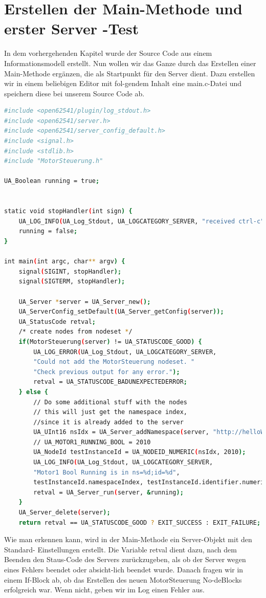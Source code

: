 \section{Erstellen der Main-Methode und erster Server -Test}
In dem vorhergehenden Kapitel wurde der Source Code aus einem Informationsmodell erstellt. Nun wollen wir das Ganze durch das Erstellen einer Main-Methode ergänzen, die als Startpunkt für den Server dient. Dazu erstellen wir in einem beliebigen Editor mit fol-gendem Inhalt eine main.c-Datei und speichern diese bei unserem Source Code ab.
\begin{lstlisting}[language=Bash]
#include <open62541/plugin/log_stdout.h>
#include <open62541/server.h>
#include <open62541/server_config_default.h>
#include <signal.h>
#include <stdlib.h>
#include "MotorSteuerung.h"

UA_Boolean running = true;


static void stopHandler(int sign) {
	UA_LOG_INFO(UA_Log_Stdout, UA_LOGCATEGORY_SERVER, "received ctrl-c");
	running = false;
}

int main(int argc, char** argv) {
	signal(SIGINT, stopHandler);
	signal(SIGTERM, stopHandler);
	
	UA_Server *server = UA_Server_new();
	UA_ServerConfig_setDefault(UA_Server_getConfig(server));
	UA_StatusCode retval;
	/* create nodes from nodeset */
	if(MotorSteuerung(server) != UA_STATUSCODE_GOOD) {
		UA_LOG_ERROR(UA_Log_Stdout, UA_LOGCATEGORY_SERVER,
		"Could not add the MotorSteuerung nodeset. "
		"Check previous output for any error.");
		retval = UA_STATUSCODE_BADUNEXPECTEDERROR;
	} else {
		// Do some additional stuff with the nodes
		// this will just get the namespace index,
		//since it is already added to the server
		UA_UInt16 nsIdx = UA_Server_addNamespace(server, "http://helloWorld.com/UA/");
		// UA_MOTOR1_RUNNING_BOOL = 2010
		UA_NodeId testInstanceId = UA_NODEID_NUMERIC(nsIdx, 2010);
		UA_LOG_INFO(UA_Log_Stdout, UA_LOGCATEGORY_SERVER,
		"Motor1 Bool Running is in ns=%d;id=%d",
		testInstanceId.namespaceIndex, testInstanceId.identifier.numeric);
		retval = UA_Server_run(server, &running);
	}
	UA_Server_delete(server);
	return retval == UA_STATUSCODE_GOOD ? EXIT_SUCCESS : EXIT_FAILURE;
\end{lstlisting}
	Wie man erkennen kann, wird in der Main-Methode ein Server-Objekt mit den Standard- Einstellungen erstellt. Die Variable retval dient dazu, nach dem Beenden den Staus-Code des Servers zurückzugeben, als ob der Server wegen eines Fehlers beendet oder absicht-lich beendet wurde.
	Danach fragen wir in einem If-Block ab, ob das Erstellen des neuen MotorSteuerung No-deBlocks erfolgreich war. Wenn nicht, geben wir im Log einen Fehler aus.
